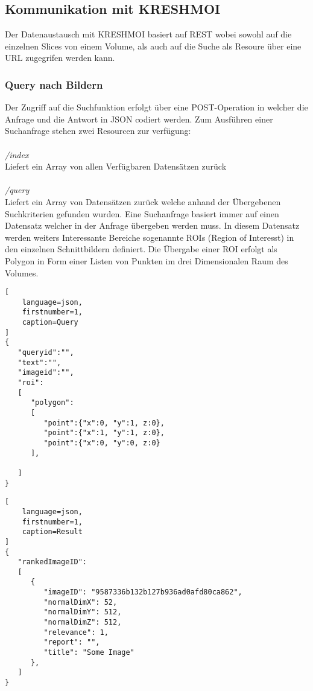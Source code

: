 \subsection{Kommunikation mit KRESHMOI}
\label{sec:Kommunikation mit KRESHMOI}
Der Datenaustausch mit KRESHMOI basiert auf REST wobei sowohl auf die einzelnen Slices von einem Volume, als auch auf die Suche als Resoure über eine URL zugegrifen werden kann.

\subsubsection{Query nach Bildern}
\label{sec:Query nach Bildern}
Der Zugriff auf die Suchfunktion erfolgt über eine POST-Operation in welcher die Anfrage und die Antwort in JSON codiert werden.
Zum Ausführen einer Suchanfrage stehen zwei Resourcen zur verfügung:
\\
\\
\textit{/index}\\
Liefert ein Array von allen Verfügbaren Datensätzen zurück 
\\
\\
\textit{/query}\\
Liefert ein Array von Datensätzen zurück welche anhand der Übergebenen Suchkriterien gefunden wurden.
Eine Suchanfrage basiert immer auf einen Datensatz welcher in der Anfrage übergeben werden muss.
In diesem Datensatz werden weiters Interessante Bereiche sogenannte ROIs (Region of Interesst) in den einzelnen Schnittbildern definiert.
Die Übergabe einer ROI erfolgt als Polygon in Form einer Listen von Punkten im drei Dimensionalen Raum des Volumes.
\begin{lstlisting}[
	language=json,
	firstnumber=1,
	caption=Query
]
{
   "queryid":"",
   "text":"",
   "imageid":"",
   "roi": 
   [
      "polygon":
      [
         "point":{"x":0, "y":1, z:0},
         "point":{"x":1, "y":1, z:0},
         "point":{"x":0, "y":0, z:0}
      ],

   ]
}
\end{lstlisting}


\begin{lstlisting}[
	language=json,
	firstnumber=1,
	caption=Result
]
{
   "rankedImageID": 
   [
      {
         "imageID": "9587336b132b127b936ad0afd80ca862",
         "normalDimX": 52,
         "normalDimY": 512,
         "normalDimZ": 512,
         "relevance": 1,
         "report": "",
         "title": "Some Image"
      },
   ]
}
\end{lstlisting}

